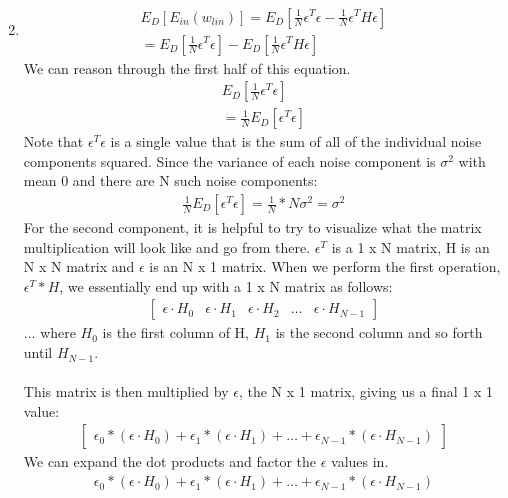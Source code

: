 \documentclass[12pt]{article}
\begin{document}
\begin{enumerate}[label=(\alph*)]
\begin{gather*}
	\end{gather*}
	\item
	\begin{gather*}
		E_D[E_{in}(w_{lin})] = E_D[\frac{1}{N}\epsilon^T\epsilon - \frac{1}{N}\epsilon^TH\epsilon]
		\\ = E_D[\frac{1}{N}\epsilon^T\epsilon] - E_D[\frac{1}{N}\epsilon^TH\epsilon]
	\end{gather*}
	We can reason through the first half of this equation.
	\begin{gather*}
		E_D[\frac{1}{N}\epsilon^T\epsilon] 
		\\ = \frac{1}{N}E_D[\epsilon^T\epsilon]
	\end{gather*}
	Note that $\epsilon^T\epsilon$ is a single value that is the sum of all of the individual noise components squared. Since the variance of each noise component is $\sigma^2$ with mean $0$ and there are N such noise components:
	\begin{gather*}
		\frac{1}{N}E_D[\epsilon^T\epsilon] = \frac{1}{N} * N\sigma^2 = \sigma^2
	\end{gather*}
	For the second component, it is helpful to try to visualize what the matrix multiplication will look like and go from there. $\epsilon^T$ is a 1 x N matrix, H is an N x N matrix and $\epsilon$ is an N x 1 matrix. When we perform the first operation, $\epsilon^T * H$, we essentially end up with a 1 x N matrix as follows:
	\begin{gather*}
	\begin{bmatrix}
		\epsilon \cdot H_0 & \epsilon \cdot H_1 & \epsilon \cdot H_2 & \dots & \epsilon \cdot H_{N-1}
	\end{bmatrix}
	\end{gather*}
	... where $H_0$ is the first column of H, $H_1$ is the second column and so forth until $H_{N-1}$.
	\\ \\ This matrix is then multiplied by $\epsilon$, the N x 1 matrix, giving us a final 1 x 1 value:
	\begin{gather*}
	\begin{bmatrix}
	\epsilon_0 * (\epsilon \cdot H_0) + \epsilon_1 * (\epsilon \cdot H_1) + \dots + \epsilon_{N-1} * (\epsilon \cdot H_{N-1})
	\end{bmatrix}	
	\end{gather*}
	We can expand the dot products and factor the $\epsilon$ values in.
	\begin{gather*}
	\epsilon_0 * (\epsilon \cdot H_0) + \epsilon_1 * (\epsilon \cdot H_1) + \dots + \epsilon_{N-1} * (\epsilon \cdot H_{N-1})

\end{gather*}
\end{enumerate}
\end{document}
